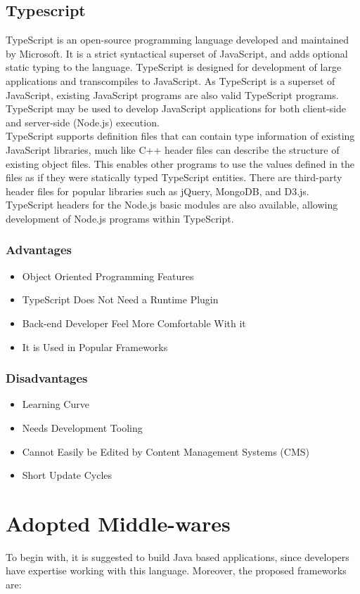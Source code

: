 \documentclass[a4paper, hidelinks, 12pt]{report}
\begin{document}
\subsection{Typescript}
TypeScript is an open-source programming language developed and maintained by Microsoft. It is a strict syntactical superset of JavaScript, and adds optional static typing to the language. TypeScript is designed for development of large applications and transcompiles to JavaScript. As TypeScript is a superset of JavaScript, existing JavaScript programs are also valid TypeScript programs. TypeScript may be used to develop JavaScript applications for both client-side and server-side (Node.js) execution.\\
TypeScript supports definition files that can contain type information of existing JavaScript libraries, much like C++ header files can describe the structure of existing object files. This enables other programs to use the values defined in the files as if they were statically typed TypeScript entities. There are third-party header files for popular libraries such as jQuery, MongoDB, and D3.js. TypeScript headers for the Node.js basic modules are also available, allowing development of Node.js programs within TypeScript.
\subsubsection{Advantages}
\begin{itemize}
\item{} Object Oriented Programming Features
\item{} TypeScript Does Not Need a Runtime Plugin
\item{} Back-end Developer Feel More Comfortable With it
\item{} It is Used in Popular Frameworks
\end{itemize}
\subsubsection{Disadvantages}
\begin{itemize}
\item{} Learning Curve
\item{} Needs Development Tooling
\item{} Cannot Easily be Edited by Content Management Systems (CMS)
\item{} Short Update Cycles
\end{itemize}

	\section{Adopted Middle-wares}
	To begin with, it is suggested to build Java based applications, since developers have expertise working with this language. Moreover, the proposed frameworks are:
\end{document}
